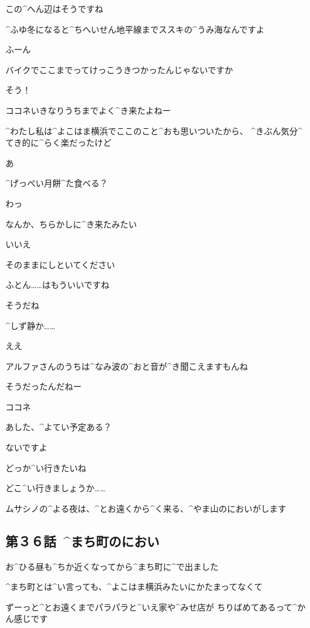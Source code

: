 \Kokone この^{へん}{辺}はそうですね

\Kokone ^{ふゆ}{冬}になると^{ちへいせん}{地平線}までススキの^{うみ}{海}なんですよ

\Alpha ふーん

\page[49]
\Kokone バイクでここまでってけっこうきつかったんじゃないですか

\Alpha そう！

\Alpha ココネいきなりうちまでよく^{き}{来}たよねー

\Alpha ^{わたし}{私}は^{よこはま}{横浜}でここのこと^{おも}{思}いついたから、
^{きぶん}{気分}^{てき}{的}に^{らく}{楽}だったけど

\Alpha あ

\Alpha ^{げっぺい}{月餅}^{た}{食}べる？

\Kokone わっ

\page[51]
\Alpha なんか、ちらかしに^{き}{来}たみたい

\Kokone いいえ

\Kokone そのままにしといてください

\Kokone ふとん……はもういいですね

\Alpha そうだね

\page[53]
\Alpha ^{しず}{静}か……

\Kokone ええ

\Kokone アルファさんのうちは^{なみ}{波}の^{おと}{音}が^{き}{聞}こえますもんね

\Alpha そうだったんだねー

\page[54]
\Alpha ココネ

\Alpha あした、^{よてい}{予定}ある？

\Kokone ないですよ

\Alpha どっか^{い}{行}きたいね

\Kokone どこ^{い}{行}きましょうか……

\page[56]
\Alpha ムサシノの^{よる}{夜}は、^{とお}{遠}くから^{く}{来}る、^{やま}{山}のにおいがします


\subsection{第３６話\ ^{まち}{町}のにおい}

\page[58]
\Alpha お^{ひる}{昼}も^{ちか}{近}くなってから^{まち}{町}に^{で}{出}ました

\page[59]
\Alpha ^{まち}{町}とは^{い}{言}っても、^{よこはま}{横浜}みたいにかたまってなくて

\Alpha ずーっと^{とお}{遠}くまでパラパラと^{いえ}{家}や^{みせ}{店}が
ちりばめてあるって^{かん}{感}じです

